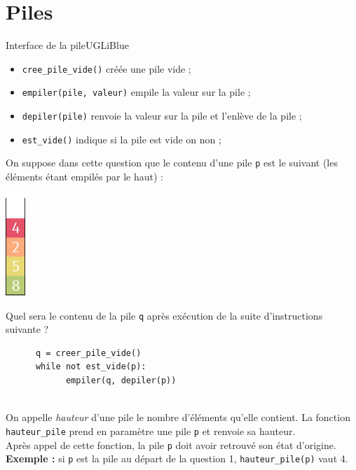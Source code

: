 \documentclass[a4paper,12pt,eval,firamath]{nsi}
\begin{document}
\section{Piles}
\resetquestion
\begin{encadrecolore}{Interface de la pile}{UGLiBlue}
      \begin{itemize}
            \item \texttt{cree_pile_vide()}  créée une pile vide ;
            \item \texttt{empiler(pile, valeur)} empile la valeur sur la pile ;
            \item \texttt{depiler(pile)} renvoie la valeur sur la pile et l'enlève de la pile ;
            \item \texttt{est_vide()} indique si la pile est vide on non ;
      \end{itemize}
\end{encadrecolore}


\question On suppose dans cette question que le contenu d'une pile \texttt{p} est le suivant (les éléments étant
empilés par le haut) :
\begin{center}
      \includegraphics[width=0.75cm]{img/pile1.png}
\end{center}
Quel sera le contenu de la pile \texttt{q} après exécution de la suite d'instructions suivante ?\\

\begin{pyc}
      \begin{verbatim}
      q = creer_pile_vide()
      while not est_vide(p):
            empiler(q, depiler(p))                  
      \end{verbatim}
\end{pyc}

\\


On appelle \textit{hauteur} d'une pile le nombre d'éléments qu'elle contient. La fonction \texttt{hauteur_pile} prend en paramètre une pile \texttt{p} et renvoie sa hauteur.\\
Après appel de cette fonction, la pile \texttt{p} doit avoir retrouvé son état d'origine.\\
\textbf{Exemple : } si \texttt{p} est la pile au départ de la question 1, \texttt{hauteur_pile(p)} vaut 4.\\
\end{document}
